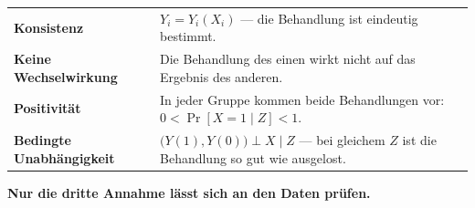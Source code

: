 \begin{merksatz}
\begin{center}
{\small
\renewcommand{\arraystretch}{1.6}
\begin{tabular}{@{}P{2.8cm}P{5.8cm}@{}}
\toprule
\textbf{Konsistenz} & $Y_i = Y_i(X_i)$ --- die Behandlung ist eindeutig bestimmt.\\
\textbf{Keine Wechselwirkung} & Die Behandlung des einen wirkt nicht auf das Ergebnis des anderen.\\
\textbf{Positivität} & In jeder Gruppe kommen beide Behandlungen vor: $0 < \Pr[X=1\mid Z] < 1$.\\
\textbf{Bedingte Unabhängigkeit} & $\bigl(Y(1),Y(0)\bigr) \perp X \mid Z$ --- bei gleichem $Z$ ist die Behandlung so gut wie ausgelost.\\
\bottomrule
\end{tabular}}
\end{center}

\begin{center}
\begin{minipage}{0.9\textwidth}
\textbf{Nur die dritte Annahme lässt sich an den Daten prüfen.}
\end{minipage}
\end{center}

\begin{center}
\begin{minipage}{0.88\textwidth}
\end{minipage}
\end{center}
\end{merksatz}

